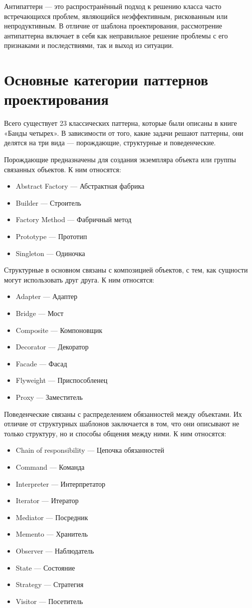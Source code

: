 Антипаттерн — это распространённый подход к решению класса часто встречающихся проблем, являющийся неэффективным, рискованным или непродуктивным. В отличие от шаблона проектирования, рассмотрение антипаттерна включает в себя как неправильное решение проблемы с его признаками и последствиями, так и выход из ситуации.

\section{Основные категории паттернов проектирования}

Всего существует 23 классических паттерна, которые были описаны в книге «Банды четырех». В зависимости от того, какие задачи решают паттерны, они делятся на три вида — порождающие, структурные и поведенческие.

Порождающие предназначены для создания экземпляра объекта или группы связанных объектов. К ним относятся:
\begin{itemize}
\item Abstract Factory — Абстрактная фабрика
\item Builder — Строитель
\item Factory Method — Фабричный метод
\item Prototype — Прототип
\item Singleton — Одиночка
\end{itemize}

Структурные в основном связаны с композицией объектов, с тем, как сущности могут использовать друг друга. К ним относятся:
\begin{itemize}
\item Adapter — Адаптер
\item Bridge — Мост
\item Composite — Компоновщик
\item Decorator — Декоратор
\item Facade — Фасад
\item Flyweight — Приспособленец
\item Proxy — Заместитель
\end{itemize}


Поведенческие связаны с распределением обязанностей между объектами. Их отличие от структурных шаблонов заключается в том, что они описывают не только структуру, но и способы общения между ними. К ним относятся:
\begin{itemize}
\item Chain of responsibility — Цепочка обязанностей
\item Command — Команда
\item Interpreter — Интерпретатор
\item Iterator — Итератор
\item Mediator — Посредник
\item Memento — Хранитель
\item Observer — Наблюдатель
\item State — Состояние
\item Strategy — Стратегия
\item Visitor — Посетитель
\end{itemize}


